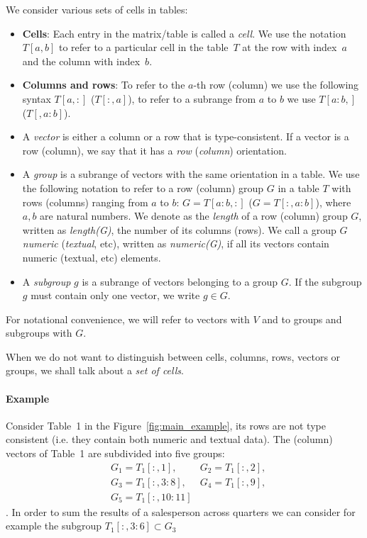 \documentclass{ecai}
\newcommand{\groups}{\ensuremath{\mathcal{G}}\xspace}
\newcommand{\range}[3]{\ensuremath{#1[#2,#3]}}
\newcommand{\rangeto}[2]{#1{:}#2}
\newcommand{\rangeall}{:}
\begin{document}
We consider various sets of cells in tables:
\begin{itemize}
  \item {\bf Cells}: Each entry in the matrix/table is called  a \textit{cell}.
  We use the notation $T[a,b]$ to refer to a particular cell in the table~$T$ at the row with index~$a$ and the column with index~$b$.
  \item {\bf Columns and rows}: To refer to the $a$-th row (column) we use the following syntax $T[a,{:}]$ ($T[{:},a]$), to refer to a subrange from $a$ to $b$ we use $T[a{:}b,]$ ($T[,a{:}b]$).
  \item
  A \textit{vector} is either a column or a row that is type-consistent.
  If a vector is a row (column), we say that it has a \textit{row} (\textit{column}) orientation.
  \item
  A \textit{group} is a subrange of vectors with the same orientation in a table.
  We use the following notation to refer to a row (column) group $G$ in a table $T$ with rows (columns) ranging from $a$ to $b$: $G = T[a{:}b,:]$ ($G = T[{:},a{:}b]$), where $a,b$ are natural numbers.
  We denote as the \textit{length} of a row (column) group $G$, written as \textit{length(G)}, the number of its columns (rows). We call a group $G$ \textit{numeric} (\textit{textual}, etc), written as \textit{numeric(G)}, if all its vectors contain numeric (textual, etc) elements.
  \item
 A \textit{subgroup} $g$ is a subrange of vectors belonging to a group $G$. If the subgroup $g$ must contain only one vector, we write $g \in G$.
\end{itemize}
For notational convenience, we will refer to vectors with $V$ and to groups and subgroups with $G$.

When we do not want to distinguish between cells, columns, rows, vectors or groups, we shall talk about a {\em set of cells}.

\paragraph{Example}
Consider Table~1 in the Figure~\ref{fig:main_example}, its rows are not type consistent (i.e. they contain both numeric and textual data).
The (column) vectors of Table~1 are subdivided into five groups:
\begin{align*}
&G_1 = \range{T_1}{\rangeall}{1},
&G_2 = \range{T_1}{\rangeall}{2},\\
&G_3 = \range{T_1}{\rangeall}{\rangeto{3}{8}},
&G_4 = \range{T_1}{\rangeall}{9},\\
&G_5 = \range{T_1}{\rangeall}{\rangeto{10}{11}}
\end{align*}.
In order to sum the results of a salesperson across quarters we can consider for example the subgroup $\range{T_1}{\rangeall}{\rangeto{3}{6}} \subset G_3$
\end{document}
